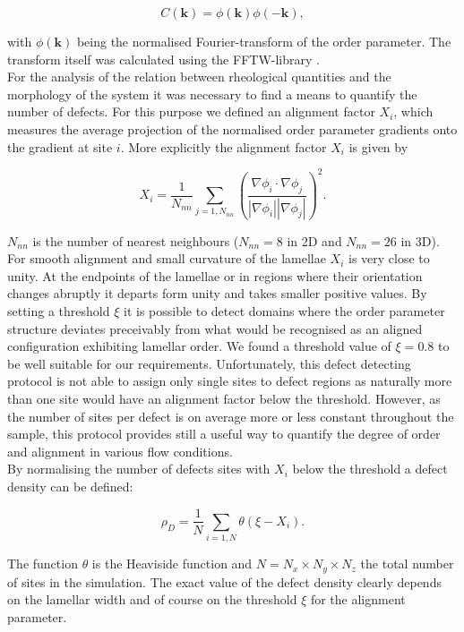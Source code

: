\documentclass[8.5pt,twoside,twocolumn]{article}
\begin{document}
\begin{equation}
C({\mathbf k})=\phi({\mathbf k})\phi(-{\mathbf k}),
\end{equation}

with $\phi({\mathbf k})$ being the normalised Fourier-transform of the order parameter.
The transform itself was calculated using the FFTW-library \cite{FFTW}.\\
For the analysis of the relation between rheological quantities and the morphology of the system it was necessary to find a means to quantify the number of defects.
For this purpose we defined an alignment factor $X_i$, which measures the average projection of the normalised order parameter gradients onto the gradient at site $i$.
More explicitly the alignment factor $X_i$ is given by

\begin{equation}\label{alignment}
X_i=\frac{1}{N_{nn}} \sum_{j=1,N_{nn}}\left(\frac{\nabla \phi_i \cdot \nabla \phi_j}{|\nabla\phi_i||\nabla\phi_j|}\right)^2. 
\end{equation}

$N_{nn}$ is the number of nearest neighbours ($N_{nn}=8$ in 2D and $N_{nn}=26$ in 3D).
For smooth alignment and small curvature of the lamellae $X_i$ is very close to unity.
At the endpoints of the lamellae or in regions where their orientation changes abruptly it departs form unity and takes smaller positive values.
By setting a threshold $\xi$ it is possible to detect domains where the order parameter structure deviates preceivably from what would be recognised as an aligned configuration exhibiting lamellar order.
We found a threshold value of $\xi=0.8$ to be well suitable for our requirements.
Unfortunately, this defect detecting protocol is not able to assign only single sites to defect regions as naturally more than one site would have an alignment factor below the threshold.
However, as the number of sites per defect is on average more or less constant throughout the sample, this protocol provides still a useful way to quantify the degree of order and alignment in various flow conditions.\\
By normalising the number of defects sites with $X_i$ below the threshold a defect density can be defined:

\begin{equation}\label{defect density}
\rho_D=\frac{1}{N} \sum_{i=1,N} \theta(\xi-X_i).  
\end{equation}

The function $\theta$ is the Heaviside function and $N=N_x\times N_y \times N_z$ the total number of sites in the simulation.
The exact value of the defect density clearly depends on the lamellar width and of course on the threshold $\xi$ for the alignment parameter.
\end{document}
